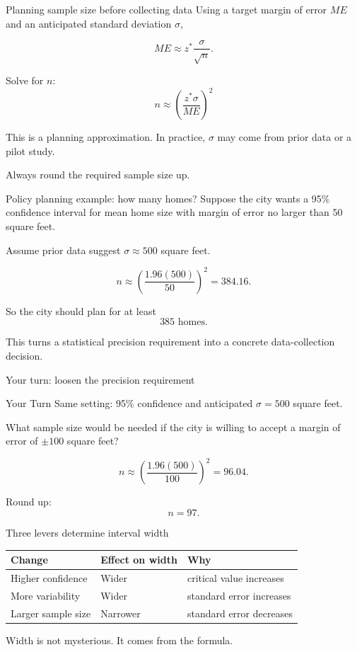 \documentclass[11pt,aspectratio=169]{beamer}
\newcommand{\yourturn}[1]{%
\begin{center}
\begin{minipage}{0.90\textwidth}
\begin{alertblock}{Your Turn}
#1
\end{alertblock}
\end{minipage}
\end{center}}
\begin{document}
\begin{frame}{Planning sample size before collecting data}
Using a target margin of error $ME$ and an anticipated standard deviation $\sigma$,

\[
ME\approx z^*\frac{\sigma}{\sqrt{n}}.
\]

Solve for $n$:
\[
\boxed{n\approx\left(\frac{z^*\sigma}{ME}\right)^2}
\]

\vspace{0.7em}
This is a planning approximation. In practice, $\sigma$ may come from prior data or a pilot study.

\vfill
\alert{Always round the required sample size up.}
\end{frame}

\begin{frame}{Policy planning example: how many homes?}
Suppose the city wants a 95\% confidence interval for mean home size with margin of error no larger than 50 square feet.

Assume prior data suggest $\sigma\approx500$ square feet.

\[
n\approx\left(\frac{1.96(500)}{50}\right)^2
=384.16.
\]

So the city should plan for at least
\[
\boxed{385\text{ homes}}.
\]

\vfill
This turns a statistical precision requirement into a concrete data-collection decision.
\end{frame}

\begin{frame}{Your turn: loosen the precision requirement}
\yourturn{Same setting: 95\% confidence and anticipated $\sigma=500$ square feet.

What sample size would be needed if the city is willing to accept a margin of error of $\pm100$ square feet?}

\vspace{0.8em}
\[
n\approx\left(\frac{1.96(500)}{100}\right)^2
=96.04.
\]

Round up:
\[
\boxed{n=97}.
\]
\end{frame}

\begin{frame}{Three levers determine interval width}
\begin{center}
\renewcommand{\arraystretch}{1.35}
\begin{tabular}{lll}
\toprule
\textbf{Change} & \textbf{Effect on width} & \textbf{Why} \\
\midrule
Higher confidence & Wider & critical value increases \\
More variability & Wider & standard error increases \\
Larger sample size & Narrower & standard error decreases \\
\bottomrule
\end{tabular}
\end{center}

\vspace{0.9em}
\begin{center}
\Large Width is not mysterious. It comes from the formula.
\end{center}
\end{frame}
\end{document}
